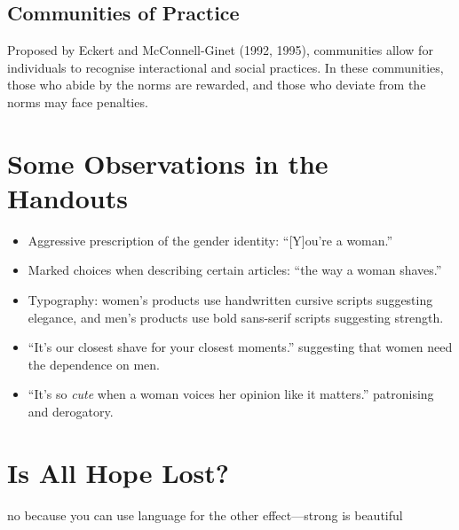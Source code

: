 \documentclass[../main.tex]{subfiles}
\begin{document}
            \subsection{Communities of Practice}
            Proposed by Eckert and McConnell-Ginet (1992, 1995), communities allow for individuals to recognise interactional and social practices. In these communities, those who abide by the norms are rewarded, and those who deviate from the norms may face penalties. 

        \section{Some Observations in the Handouts}
        \begin{itemize}
            \item Aggressive prescription of the gender identity: ``[Y]ou're a woman.''
            \item Marked choices when describing certain articles: ``the way a woman shaves.''
            \item Typography: women's products use handwritten cursive scripts suggesting elegance, and men's products use bold sans-serif scripts suggesting strength.
            \item ``It's our closest shave for your closest moments.'' suggesting that women need the dependence on men.
            \item ``It's so \textit{cute} when a woman voices her opinion like it matters.'' patronising and derogatory.
        \end{itemize}

        \section{Is All Hope Lost?}
        no because you can use language for the other effect---strong is beautiful
\end{document}
